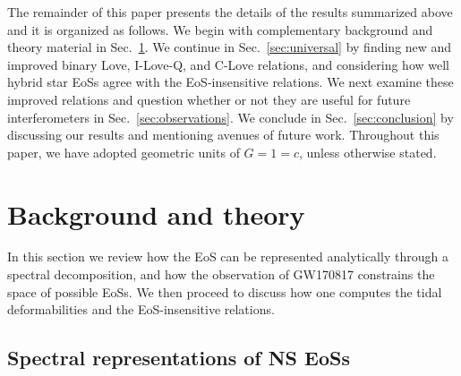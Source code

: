 \documentclass[prd,twocolumn,nofootinbib,superscriptaddress,amsmath,amssymb]{revtex4-1}
\begin{document}
The remainder of this paper presents the details of the results summarized above and it is organized as follows. 
We begin with complementary background and theory material in Sec.~\ref{sec:theory}.
We continue in Sec.~\ref{sec:universal} by finding new and improved binary Love, I-Love-Q, and C-Love relations, and considering how well hybrid star EoSs agree with the EoS-insensitive relations.
We next examine these improved relations and question whether or not they are useful for future interferometers in Sec.~\ref{sec:observations}.
We conclude in Sec.~\ref{sec:conclusion} by discussing our results and mentioning avenues of future work.
Throughout this paper, we have adopted geometric units of $G=1=c$, unless otherwise stated.


\section{Background and theory}\label{sec:theory}

In this section we review how the EoS can be represented analytically
through a spectral decomposition, and how the observation of GW170817
constrains the space of possible EoSs. We then proceed to discuss 
how one computes the tidal deformabilities and the EoS-insensitive relations. 

\subsection{Spectral representations of NS EoSs}
\label{sec:eos}
\end{document}
